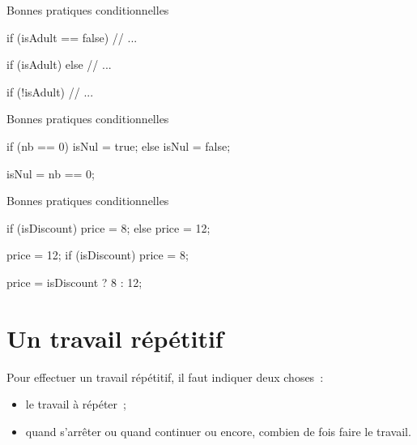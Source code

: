 \begin{hideedit}
\begin{frame}[fragile]{Bonnes pratiques conditionnelles}
  \begin{wrong}
  \begin{java}
if (isAdult == false) {
    // ...
}
  \end{java}
  \end{wrong}
  \pause
  \begin{wrong}
  \begin{java}
if (isAdult) {}
else {
    // ...
}
  \end{java}
  \end{wrong}
  \pause
  \begin{java}
if (!isAdult) {
    // ...
}
  \end{java}
\end{frame}

\begin{frame}[fragile]{Bonnes pratiques conditionnelles}
  
  \begin{wrong}
  \begin{java}
if (nb == 0){
    isNul = true;
} else {
    isNul = false;
}
  \end{java}
  \end{wrong}
  \pause
  \begin{java}
isNul = nb == 0;
  \end{java}
\end{frame}

\begin{frame}[fragile]{Bonnes pratiques conditionnelles}
  \begin{java}
if (isDiscount) {
    price = 8;
} else {
    price = 12;
}
  \end{java}
  \begin{wrong}
  \begin{java}
price = 12;
if (isDiscount) {
    price = 8;
}
  \end{java}
  \end{wrong}
  \pause
  \begin{java}
price = isDiscount ? 8 : 12;
  \end{java}
\end{frame}

\section{Un travail répétitif}
\frame{\sectionpage}
\begin{frame}
  Pour effectuer un travail répétitif, il faut indiquer deux choses~:
  \begin{itemize}
    \item le travail à répéter~;
    \item quand s’arrêter ou quand continuer ou encore,  combien de fois faire 
      le travail.
  \end{itemize}
\end{frame}


\end{hideedit}
